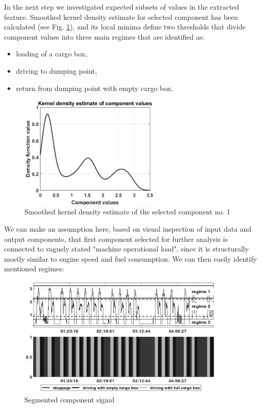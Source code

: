 In the next step we investigated expected subsets of values in the extracted feature. Smoothed kernel density estimate for selected component has been calculated (see Fig. \ref{fig: f3}), and its local minima define two thresholds that divide component values into three main regimes that are identified as:
\begin{itemize}
\renewcommand{\labelitemi}{$\bullet$}
\item loading of a cargo box,
\item driving to dumping point,
\item return from dumping point with empty cargo box.
\end{itemize}
\begin{figure}[ht!]
\vspace{-20pt}
\centering
\includegraphics[width = 0.6\textwidth]{Wykresy/ksd.png}
\caption{Smoothed kernel density estimate of the selected component no. 1}
\label{fig: f3}
\end{figure}
We can make an assumption here, based on visual inspection of input data and output components, that first component selected for further analysis is connected to vaguely stated "machine operational load", since it is structurally mostly similar to engine speed and fuel consumption. We can then easily identify mentioned regimes:
\begin{figure}[ht!]
\centering
\includegraphics[width = 0.9\textwidth]{Wykresy/2.png}
\caption{Segmented component signal}
\label{fig: f4}
\end{figure}
